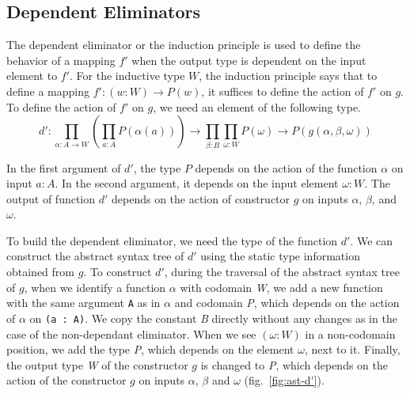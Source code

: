 \documentclass[sigplan,10pt]{acmart}
\begin{document}
\subsection{Dependent Eliminators}
\label{sec:sec3.2}

The dependent eliminator or the induction principle is used to define the behavior of a mapping $f'$ when the output type is dependent on the input element to $f'$. For the inductive type $W$, the induction principle says that to define a mapping $f' : (w : W) \rightarrow P(w)$, it suffices to define the action of $f'$ on $g$. To define the action of $f'$ on $g$, we need an element of the following type.
\begin{equation}
d' : \prod_{\alpha : A \rightarrow W} (\prod_{a : A} P(\alpha (a))) \rightarrow  \prod_{\beta : B} \prod_{\omega : W} P(\omega) \rightarrow P (g(\alpha, \beta, \omega)) \nonumber
\end{equation}

In the first argument of $d'$, the type $P$ depends on the action of the function $\alpha$ on input $a : A$. In the second argument, it depends on the input element $\omega : W$. The output of function $d'$ depends on the action of constructor $g$ on inputs $\alpha$, $\beta$, and $\omega$.

To build the dependent eliminator, we need the type of the function $d'$. We can construct the abstract syntax tree of $d'$ using the static type information obtained from $g$. To construct $d'$, during the traversal of the abstract syntax tree of $g$, when we identify a function $\alpha$ with codomain \emph{W}, we add a new function with the same argument {\tt A} as in $\alpha$ and codomain \emph{P}, which depends on the action of $\alpha$ on {\tt (a : A)}. We copy the constant \emph{B} directly without any changes as in the case of the non-dependant eliminator. When we see $(\omega : W)$ in a non-codomain position, we add the type \emph{P}, which depends on the element $\omega$, next to it. Finally, the output type \emph{W} of the constructor $g$ is changed to \emph{P}, which depends on the action of the constructor $g$ on inputs $\alpha$, $\beta$ and $\omega$ (fig.~\ref{fig:ast-d'}).
\end{document}
